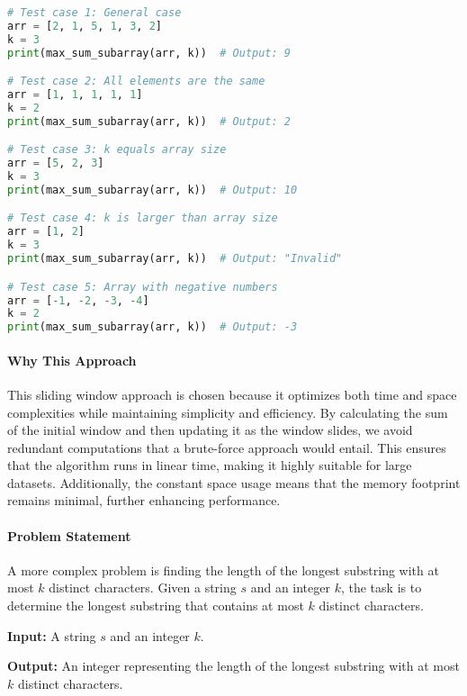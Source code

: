 \begin{lstlisting}[language=Python]
# Test case 1: General case
arr = [2, 1, 5, 1, 3, 2]
k = 3
print(max_sum_subarray(arr, k))  # Output: 9

# Test case 2: All elements are the same
arr = [1, 1, 1, 1, 1]
k = 2
print(max_sum_subarray(arr, k))  # Output: 2

# Test case 3: k equals array size
arr = [5, 2, 3]
k = 3
print(max_sum_subarray(arr, k))  # Output: 10

# Test case 4: k is larger than array size
arr = [1, 2]
k = 3
print(max_sum_subarray(arr, k))  # Output: "Invalid"

# Test case 5: Array with negative numbers
arr = [-1, -2, -3, -4]
k = 2
print(max_sum_subarray(arr, k))  # Output: -3
\end{lstlisting}

\paragraph*{Why This Approach}

This sliding window approach is chosen because it optimizes both time and space complexities while maintaining simplicity and efficiency. By calculating the sum of the initial window and then updating it as the window slides, we avoid redundant computations that a brute-force approach would entail. This ensures that the algorithm runs in linear time, making it highly suitable for large datasets. Additionally, the constant space usage means that the memory footprint remains minimal, further enhancing performance.


\paragraph*{Problem Statement}

A more complex problem is finding the length of the longest substring with at most \(k\) distinct characters. Given a string \(s\) and an integer \(k\), the task is to determine the longest substring that contains at most \(k\) distinct characters.

\textbf{Input:} A string \(s\) and an integer \(k\).

\textbf{Output:} An integer representing the length of the longest substring with at most \(k\) distinct characters.

